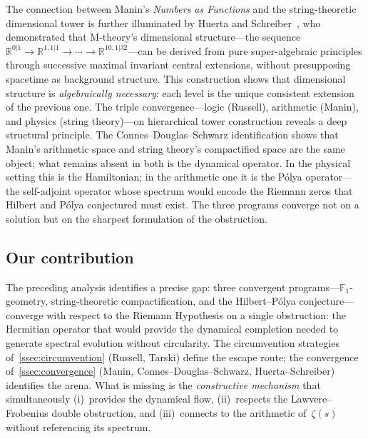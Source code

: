 The connection between Manin's \emph{Numbers as Functions} and the
string-theoretic dimensional tower is further illuminated by Huerta and
Schreiber~\cite{huerta2018m}, who demonstrated that M-theory's dimensional
structure---the sequence
$\mathbb{R}^{0|1} \to \mathbb{R}^{1,1|1} \to \cdots
\to \mathbb{R}^{10,1|32}$---can be derived from pure super-algebraic
principles through successive maximal invariant central extensions,
without presupposing spacetime as background structure.  This
construction shows that dimensional structure is \emph{algebraically
necessary}: each level is the unique consistent extension of the
previous one.  The triple convergence---logic (Russell), arithmetic
(Manin), and physics (string theory)---on hierarchical tower
construction reveals a deep structural principle.  The
Connes--Douglas--Schwarz identification shows that Manin's arithmetic
space and string theory's compactified space are the same object; what
remains absent in both is the dynamical operator.  In the physical
setting this is the Hamiltonian; in the arithmetic one it is the
P\'olya operator---the self-adjoint operator whose spectrum would
encode the Riemann zeros that Hilbert and P\'olya conjectured must
exist.  The three programs converge not on a solution but on the
sharpest formulation of the obstruction.

\subsection{Our contribution}\label{ssec:contribution}

The preceding analysis identifies a precise gap: three convergent
programs---$\mathbb{F}_1$-geometry, string-theoretic
compactification, and the Hilbert--P\'olya conjecture---converge with
respect to the Riemann Hypothesis on a single obstruction: the
Hermitian operator that would provide the dynamical completion needed
to generate spectral evolution without circularity.
The circumvention strategies of~\cref{ssec:circumvention} (Russell,
Tarski) define the escape route; the convergence
of~\cref{ssec:convergence} (Manin, Connes--Douglas--Schwarz,
Huerta--Schreiber) identifies the arena.  What is missing is the
\emph{constructive mechanism} that simultaneously (i)~provides the
dynamical flow, (ii)~respects the Lawvere--Frobenius double
obstruction, and (iii)~connects to the arithmetic of~$\zeta(s)$ without
referencing its spectrum.

